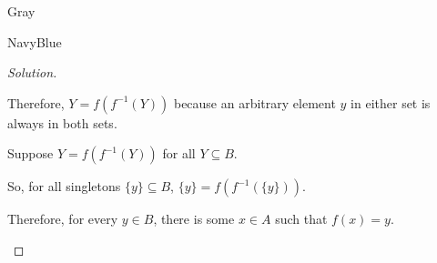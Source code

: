 \documentclass[12pt]{amsart}
\theoremstyle{named}
\newenvironment{soln}
{\begin{color}{Gray}\begin{framed}\begin{color}{NavyBlue}\begin{proof}[Solution]
\doublespacing}
{\end{proof}\end{color}\end{framed}\end{color}}
\theoremstyle{definition}
\begin{document}
\begin{soln}
\begin{enumerate}
        \phantom{ }

        \noindent Therefore, $Y = f(f^{-1}(Y))$ because an arbitrary element $y$ in either set is always in both sets. 

        \phantom{ }

        \phantom{ }

        \noindent Suppose $Y = f(f^{-1}(Y))$ for all $Y \subseteq B$.

        \noindent So, for all singletons $\{y\} \subseteq B$, $\{y\} = f(f^{-1}(\{y\}))$.

        \noindent Therefore, for every $y \in B$, there is some $x \in A$ such that $f(x) = y$. 


    \end{enumerate}
\end{soln}
\end{document}
